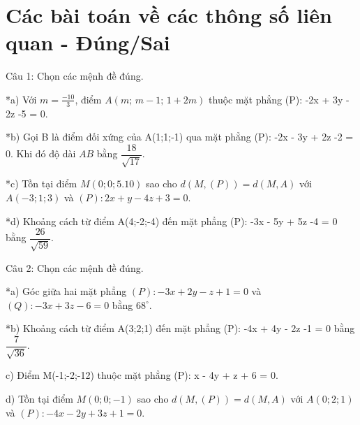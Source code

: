 \documentclass[a4paper,12pt]{article}
\begin{document}
\section*{Các bài toán về các thông số liên quan - Đúng/Sai}

Câu 1: Chọn các mệnh đề đúng.

*a) Với $m = \frac{-10}{3}$, điểm $A(m;\, m-1;\, 1+2m)$ thuộc mặt phẳng (P): -2x + 3y - 2z -5 = 0.

*b) Gọi B là điểm đối xứng của A(1;1;-1) qua mặt phẳng (P): -2x - 3y + 2z -2 = 0. Khi đó độ dài $AB$ bằng $ \dfrac{18}{\sqrt{17}} $.

*c) Tồn tại điểm $M(0;0;5.10)$ sao cho $d(M,(P)) = d(M,A)$ với $A(-3;1;3)$ và $(P): 2x + y - 4z + 3 = 0$.

*d) Khoảng cách từ điểm A(4;-2;-4) đến mặt phẳng (P): -3x - 5y + 5z -4 = 0 bằng $ \dfrac{26}{\sqrt{59}} $.



Câu 2: Chọn các mệnh đề đúng.

*a) Góc giữa hai mặt phẳng $(P): -3x + 2y - z + 1 = 0$ và $(Q): -3x + 3z -6 = 0$ bằng $ 68^\circ $.

*b) Khoảng cách từ điểm A(3;2;1) đến mặt phẳng (P): -4x + 4y - 2z -1 = 0 bằng $ \dfrac{7}{\sqrt{36}} $.

c) Điểm M(-1;-2;-12) thuộc mặt phẳng (P): x - 4y + z + 6 = 0.

d) Tồn tại điểm $M(0;0;-1)$ sao cho $d(M,(P)) = d(M,A)$ với $A(0;2;1)$ và $(P): -4x - 2y + 3z + 1 = 0$.
\end{document}
